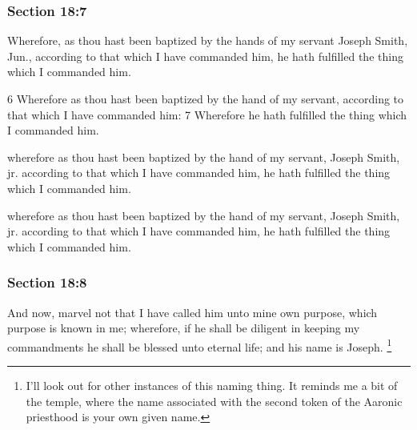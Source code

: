 	\subsubsection{Section 18:7} %
		\label{DC18-7}

		Wherefore, as thou hast been baptized by the hands of my servant Joseph Smith, Jun., according to that which I have commanded him, he hath fulfilled the thing which I commanded him.

		\begin{framed}
		\scriptsize
			\begin{compactdesc}
				\item[JSP] 6 Wherefore as thou hast been baptized by the hand of my servant, according to that which I have commanded him: 7 Wherefore he hath fulfilled the thing which I commanded him.
				\item[DC 1835] wherefore as thou hast been baptized by the hand of my servant, Joseph Smith, jr. according to that which I have commanded him, he hath fulfilled the thing which I commanded him. 
				\item[DC 1844] wherefore as thou hast been baptized by the hand of my servant, Joseph Smith, jr. according to that which I have commanded him, he hath fulfilled the thing which I commanded him. 
			\end{compactdesc}
		\end{framed}

	\subsubsection{Section 18:8} %
		\label{DC18-8}

		And now, marvel not that I have called him unto mine own purpose, which purpose is known in me; wherefore, if he shall be diligent in keeping my commandments he shall be blessed unto eternal life; and his name is Joseph.%
			\footnote{%
				I'll look out for other instances of this naming thing. It reminds me a bit of the temple, where the name associated with the second token of the Aaronic priesthood is your own given name.
				}


